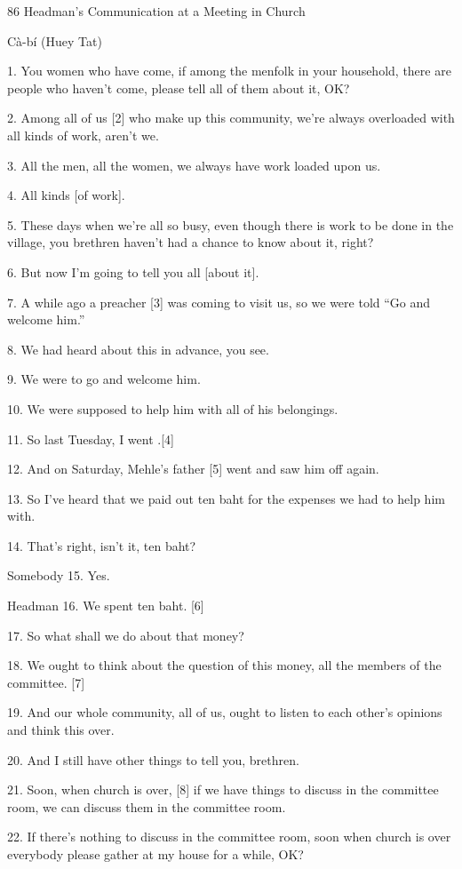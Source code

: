 
{86 Headman's Communication at a Meeting in Church}

{Cà-bí (Huey Tat)}

{1. You women who have come, if among the menfolk in your household, there
are people who haven't come, please tell all of them about it, OK?}

{2. Among all of us [2] who make up this community, we're always overloaded
with all kinds of work, aren't we.}

{3. All the men, all the women, we always have work loaded upon us.}

{4. All kinds [of work].}

{5. These days when we're all so busy, even though there is work to be done
in the village, you brethren haven't had a chance to know about it, right?}

{6. But now I'm going to tell you all [about it].}

{7. A while ago a preacher [3] was coming to visit us, so we were told ``Go
and welcome him.''}

{8. We had heard about this in advance, you see.}

{9. We were to go and welcome him.}

{10. We were supposed to help him with all of his belongings.}

{11. So last Tuesday, I went .[4]}

{12. And on Saturday, Mehle's father [5] went and saw him off again.}

{13. So I've heard that we paid out ten baht for the expenses we had to
help him with.}

{14. That's right, isn't it, ten baht?}

{Somebody 15. Yes.}

{Headman 16. We spent ten baht. [6]}

{17. So what shall we do about that money?}

{18. We ought to think about the question of this money, all the members
of the committee. [7]}

{19. And our whole community, all of us, ought to listen to each other's
opinions and think this over.}

{20. And I still have other things to tell you, brethren.}

{21. Soon, when church is over, [8] if we have things to discuss in the
committee room, we can discuss them in the committee room.}

{22. If there's nothing to discuss in the committee room, soon when church
is over everybody please gather at my house for a while, OK?}

